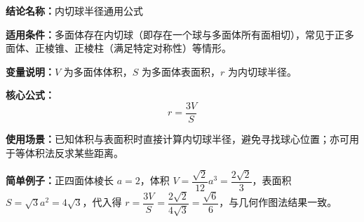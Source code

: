 \textbf{结论名称：}内切球半径通用公式

\textbf{适用条件：}多面体存在内切球（即存在一个球与多面体所有面相切），常见于正多面体、正棱锥、正棱柱（满足特定对称性）等情形。

\textbf{变量说明：}$V$ 为多面体体积，$S$ 为多面体表面积，$r$ 为内切球半径。

\textbf{核心公式：}\[\boxed{r = \frac{3V}{S}}\]

\textbf{使用场景：}已知体积与表面积时直接计算内切球半径，避免寻找球心位置；亦可用于等体积法反求某些距离。

\textbf{简单例子：}正四面体棱长 $a=2$，体积 $V=\dfrac{\sqrt{2}}{12}a^3=\dfrac{2\sqrt{2}}{3}$，表面积 $S=\sqrt{3}a^2=4\sqrt{3}$，代入得 $r=\dfrac{3V}{S}=\dfrac{2\sqrt{2}}{4\sqrt{3}}=\dfrac{\sqrt{6}}{6}$，与几何作图法结果一致。